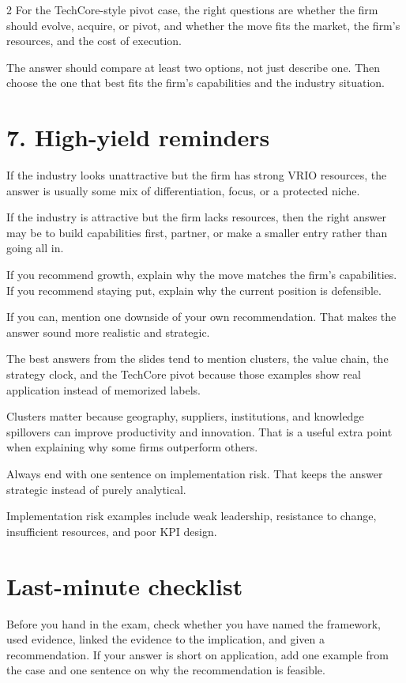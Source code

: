 \documentclass[8pt,letterpaper]{article}
\begin{document}
\begin{multicols}{2}
For the TechCore-style pivot case, the right questions are whether the firm should evolve, acquire, or pivot, and whether the move fits the market, the firm's resources, and the cost of execution.

The answer should compare at least two options, not just describe one. Then choose the one that best fits the firm's capabilities and the industry situation.

\section*{7. High-yield reminders}
If the industry looks unattractive but the firm has strong VRIO resources, the answer is usually some mix of differentiation, focus, or a protected niche.

If the industry is attractive but the firm lacks resources, then the right answer may be to build capabilities first, partner, or make a smaller entry rather than going all in.

If you recommend growth, explain why the move matches the firm's capabilities. If you recommend staying put, explain why the current position is defensible.

If you can, mention one downside of your own recommendation. That makes the answer sound more realistic and strategic.

The best answers from the slides tend to mention clusters, the value chain, the strategy clock, and the TechCore pivot because those examples show real application instead of memorized labels.

Clusters matter because geography, suppliers, institutions, and knowledge spillovers can improve productivity and innovation. That is a useful extra point when explaining why some firms outperform others.

Always end with one sentence on implementation risk. That keeps the answer strategic instead of purely analytical.

Implementation risk examples include weak leadership, resistance to change, insufficient resources, and poor KPI design.

\section*{Last-minute checklist}
Before you hand in the exam, check whether you have named the framework, used evidence, linked the evidence to the implication, and given a recommendation. If your answer is short on application, add one example from the case and one sentence on why the recommendation is feasible.


\end{multicols}
\end{document}
